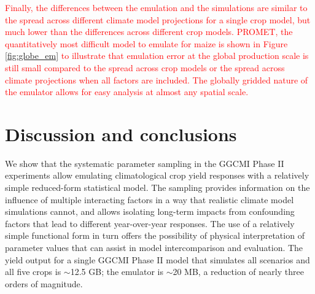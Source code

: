 \documentclass[gmd, manuscript]{copernicus} %
\begin{document}
\textcolor{red}{
Finally, the differences between the emulation and the simulations are similar to the spread across different climate model projections for a single crop model, but much lower than the differences across different crop models.
PROMET, the quantitatively most difficult model to emulate for maize is shown in Figure \ref{fig:globe_em} to illustrate that emulation error at the global production scale is still small compared to the spread across crop models or the spread across climate projections when all factors are included.
The globally gridded nature of the emulator allows for easy analysis at almost any spatial scale.
}




\section{Discussion and conclusions} 
\label{S:6}
We show that the systematic parameter sampling in the GGCMI Phase II experiments allow emulating climatological crop yield responses with a relatively simple reduced-form statistical model. 
The sampling provides information on the influence of multiple interacting factors in a way that realistic climate model simulations cannot, and allows isolating long-term impacts from confounding factors that lead to different year-over-year responses. 
The use of a relatively simple functional form in turn offers the possibility of physical interpretation of parameter values that can assist in model intercomparison and evaluation. 
The yield output for a single GGCMI Phase II model that simulates all scenarios and all five crops is $\sim$12.5 GB; the emulator is $\sim$20 MB, a reduction of nearly three orders of magnitude. 
\end{document}
